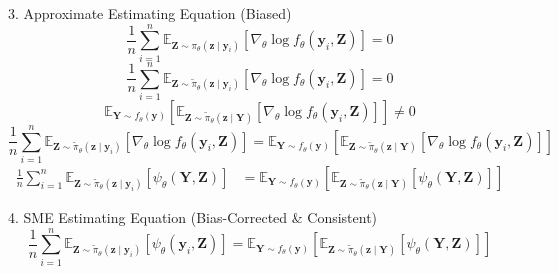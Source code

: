 \documentclass{beamer}
\begin{document}
\begin{frame}{3. Approximate Estimating Equation (Biased)}
\begin{equation*}
\frac{1}{n} \sum_{i=1}^n 
\mathbb{E}_{\mathbf{Z} \sim \pi_\theta(\bm{z} \mid \bm{y}_i)} 
\left[
\nabla_\theta \log f_\theta(\bm{y}_i, \mathbf{Z})
\right] = 0
\end{equation*}
\begin{equation*}
\frac{1}{n} \sum_{i=1}^n 
\mathbb{E}_{\mathbf{Z} \sim \tilde{\pi}_\theta(\bm{z} \mid \bm{y}_i)} 
\left[
\nabla_\theta \log f_\theta(\bm{y}_i, \mathbf{Z})
\right]
= 0
\end{equation*}
\begin{equation*}
\mathbb{E}_{\mathbf{Y} \sim f_\theta(\bm{y})}
\left[
\mathbb{E}_{\mathbf{Z} \sim \tilde{\pi}_\theta(\bm{z} \mid \mathbf{Y})} 
\left[
\nabla_\theta \log f_\theta(\bm{y}_i, \mathbf{Z})
\right]
\right] \neq 0
\end{equation*}
\begin{equation*}
\frac{1}{n} \sum_{i=1}^n 
\mathbb{E}_{\mathbf{Z} \sim \tilde{\pi}_\theta(\bm{z} \mid \bm{y}_i)} 
\left[
\nabla_\theta \log f_\theta(\bm{y}_i, \mathbf{Z})
\right]
=
\mathbb{E}_{\mathbf{Y} \sim f_\theta(\bm{y})}
\left[
\mathbb{E}_{\mathbf{Z} \sim \tilde{\pi}_\theta(\bm{z} \mid \mathbf{Y})} 
\left[
\nabla_\theta \log f_\theta(\bm{y}_i, \mathbf{Z})
\right]
\right]
\end{equation*}
\begin{align*}
\frac{1}{n} \sum_{i=1}^n 
\mathbb{E}_{\mathbf{Z} \sim \tilde{\pi}_\theta(\bm{z} \mid \bm{y}_i)} 
\left[
\psi_\theta(\mathbf{Y}, \mathbf{Z})
\right]
&=
\mathbb{E}_{\mathbf{Y} \sim f_\theta(\bm{y})}
\left[
\mathbb{E}_{\mathbf{Z} \sim \tilde{\pi}_\theta(\bm{z} \mid \mathbf{Y})} 
\left[
\psi_\theta(\mathbf{Y}, \mathbf{Z})
\right]
\right]
\end{align*}
\end{frame}

\begin{frame}{4. SME Estimating Equation (Bias-Corrected \& Consistent)}
\begin{equation*}
\frac{1}{n} \sum_{i=1}^n 
\mathbb{E}_{\mathbf{Z} \sim \tilde{\pi}_\theta(\bm{z} \mid \bm{y}_i)} 
\left[
\psi_\theta(\bm{y}_i, \mathbf{Z})
\right]
=
\mathbb{E}_{\mathbf{Y} \sim f_\theta(\bm{y})}
\left[
\mathbb{E}_{\mathbf{Z} \sim \tilde{\pi}_\theta(\bm{z} \mid \mathbf{Y})} 
\left[
\psi_\theta(\mathbf{Y}, \mathbf{Z})
\right]
\right]
\end{equation*}
\end{frame}
\end{document}
